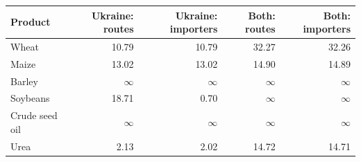 \begin{tabular}{lrrrr}
\toprule
Product & Ukraine: routes & Ukraine: importers & Both: routes & Both: importers \\
\midrule
Wheat & 10.79 & 10.79 & 32.27 & 32.26 \\
Maize & 13.02 & 13.02 & 14.90 & 14.89 \\
Barley & $\infty$ & $\infty$ & $\infty$ & $\infty$ \\
Soybeans & 18.71 & 0.70 & $\infty$ & $\infty$ \\
Crude seed oil & $\infty$ & $\infty$ & $\infty$ & $\infty$ \\
Urea & 2.13 & 2.02 & 14.72 & 14.71 \\
\bottomrule
\end{tabular}
